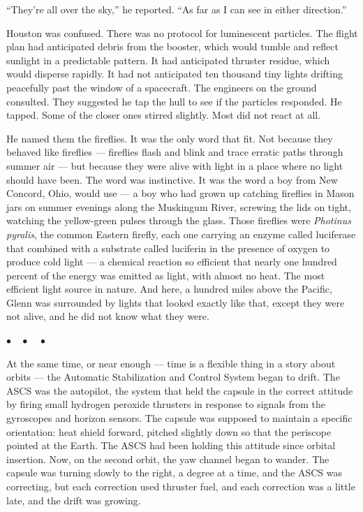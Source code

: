 \documentclass[12pt, letterpaper]{article}
\begin{document}
``They're all over the sky,'' he reported. ``As far as I can see in either direction.''

Houston was confused. There was no protocol for luminescent particles. The flight plan had anticipated debris from the booster, which would tumble and reflect sunlight in a predictable pattern. It had anticipated thruster residue, which would disperse rapidly. It had not anticipated ten thousand tiny lights drifting peacefully past the window of a spacecraft. The engineers on the ground consulted. They suggested he tap the hull to see if the particles responded. He tapped. Some of the closer ones stirred slightly. Most did not react at all.

He named them the fireflies. It was the only word that fit. Not because they behaved like fireflies --- fireflies flash and blink and trace erratic paths through summer air --- but because they were alive with light in a place where no light should have been. The word was instinctive. It was the word a boy from New Concord, Ohio, would use --- a boy who had grown up catching fireflies in Mason jars on summer evenings along the Muskingum River, screwing the lids on tight, watching the yellow-green pulses through the glass. Those fireflies were \emph{Photinus pyralis}, the common Eastern firefly, each one carrying an enzyme called luciferase that combined with a substrate called luciferin in the presence of oxygen to produce cold light --- a chemical reaction so efficient that nearly one hundred percent of the energy was emitted as light, with almost no heat. The most efficient light source in nature. And here, a hundred miles above the Pacific, Glenn was surrounded by lights that looked exactly like that, except they were not alive, and he did not know what they were.

\begin{center}
$\bullet\quad\bullet\quad\bullet$
\end{center}

At the same time, or near enough --- time is a flexible thing in a story about orbits --- the Automatic Stabilization and Control System began to drift. The ASCS was the autopilot, the system that held the capsule in the correct attitude by firing small hydrogen peroxide thrusters in response to signals from the gyroscopes and horizon sensors. The capsule was supposed to maintain a specific orientation: heat shield forward, pitched slightly down so that the periscope pointed at the Earth. The ASCS had been holding this attitude since orbital insertion. Now, on the second orbit, the yaw channel began to wander. The capsule was turning slowly to the right, a degree at a time, and the ASCS was correcting, but each correction used thruster fuel, and each correction was a little late, and the drift was growing.
\end{document}
